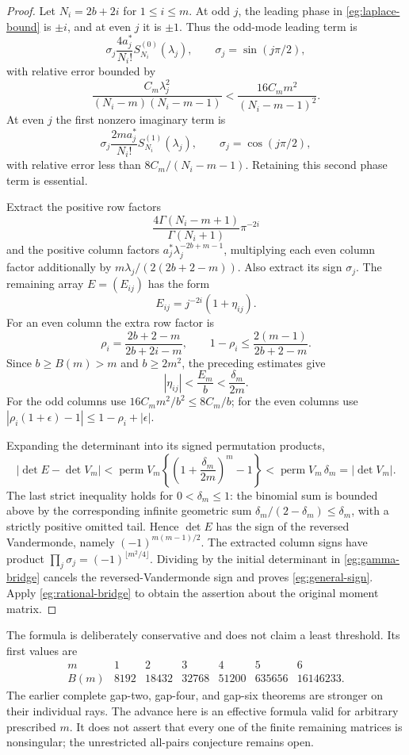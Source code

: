 \begin{proof}
Let $N_i=2b+2i$ for $1\le i\le m$.  At odd $j$, the leading
phase in \eqref{eg:laplace-bound} is $\pm i$, and at even $j$
it is $\pm1$.  Thus the odd-mode leading term is
\[
 \sigma_j\frac{4a_j^*}{N_i!}S_{N_i}^{(0)}(\lambda_j),
 \qquad \sigma_j=\sin(j\pi/2),
\]
with relative error bounded by
\[
 \frac{C_m\lambda_j^2}{(N_i-m)(N_i-m-1)}
       <\frac{16C_mm^2}{(N_i-m-1)^2}.
\]
At even $j$ the first nonzero imaginary term is
\[
 \sigma_j\frac{2ma_j^*}{N_i!}S_{N_i}^{(1)}(\lambda_j),
 \qquad \sigma_j=\cos(j\pi/2),
\]
with relative error less than $8C_m/(N_i-m-1)$.
Retaining this second phase term is essential.

Extract the positive row factors
\[
 \frac{4\Gamma(N_i-m+1)}{\Gamma(N_i+1)}\pi^{-2i}
\]
and the positive column factors $a_j^*\lambda_j^{-2b+m-1}$,
multiplying each even column factor additionally by
$m\lambda_j/(2(2b+2-m))$.  Also extract its sign $\sigma_j$.
The remaining array $E=(E_{ij})$ has the form
\[
 E_{ij}=j^{-2i}(1+\eta_{ij}).
\]
For an even column the extra row factor is
\[
 \rho_i=\frac{2b+2-m}{2b+2i-m},\qquad
 1-\rho_i\le\frac{2(m-1)}{2b+2-m}.
\]
Since $b\ge B(m)>m$ and $b\ge2m^2$, the preceding estimates give
\begin{equation}\label{eg:eta}
 |\eta_{ij}|<\frac{E_m}{b}<\frac{\delta_m}{2m}.
\end{equation}
For the odd columns use
$16C_mm^2/b^2\le8C_m/b$; for the even columns use
$|\rho_i(1+\epsilon)-1|\le1-\rho_i+|\epsilon|$.

Expanding the determinant into its signed permutation products,
\[
 |\det E-\det V_m|
 <\operatorname{perm}V_m
       \left\{\left(1+\frac{\delta_m}{2m}\right)^m-1\right\}
 <\operatorname{perm}V_m\,\delta_m=|\det V_m|.
\]
The last strict inequality holds for $0<\delta_m\le1$: the binomial
sum is bounded above by the corresponding infinite geometric sum
$\delta_m/(2-\delta_m)\le\delta_m$, with a strictly positive
omitted tail.  Hence $\det E$ has the sign of the reversed
Vandermonde, namely $(-1)^{m(m-1)/2}$.
The extracted column signs have product
$\prod_j\sigma_j=(-1)^{\lfloor m^2/4\rfloor}$.
Dividing by the initial determinant in \eqref{eg:gamma-bridge}
cancels the reversed-Vandermonde sign and proves
\eqref{eg:general-sign}.  Apply \eqref{eg:rational-bridge} to
obtain the assertion about the original moment matrix.
\end{proof}

The formula is deliberately conservative and does not claim a least
threshold.  Its first values are
\[
 \begin{array}{c|rrrrrr}
 m&1&2&3&4&5&6\\ \hline
 B(m)&8192&18432&32768&51200&635656&16146233.
 \end{array}
\]
The earlier complete gap-two, gap-four, and gap-six theorems are
stronger on their individual rays.  The advance here is an effective
formula valid for arbitrary prescribed $m$.  It does not assert
that every one of the finite remaining matrices is nonsingular;
the unrestricted all-pairs conjecture remains open.

